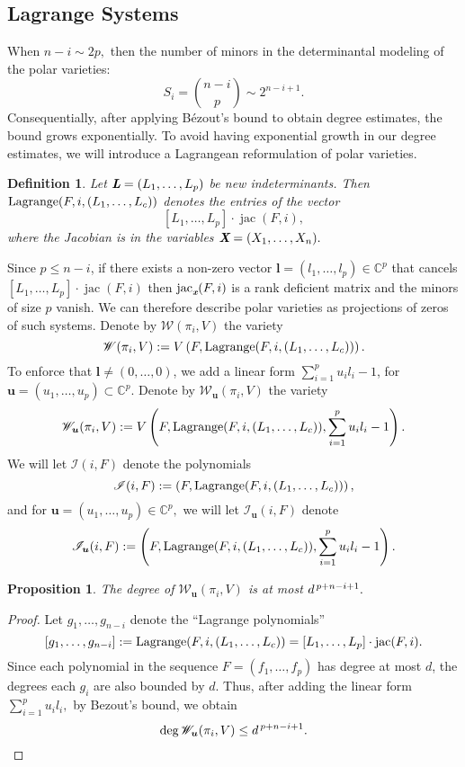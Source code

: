 \documentclass[a4paper]{article}
\def\sW{\mathscr{W}}
\def\sI{\mathscr{I}}
\def\Lb{\textit{\textbf{L}}}
\def\Xb{\textit{\textbf{X}}}
\def\ub{{\bm u}}
\def\lb{{\bm l}}
\def\xb{\textit{\textbf{x}}}
\DeclareMathOperator{\jac}{jac}
\DeclareMathOperator{\lag}{Lagrange}
\def\C{\mathbb{C}}
\def\ji{\jac_{\xb}(F,i)}
\def\lagF{{\bm\lag}(F,i,(L_1,\hdots,L_c))}
\def\Iil{\mathscr{I}_{\ub}(i,F)}
\def\Wil{\mathscr{W}_{\ub}(\pi_i,V)}
\def\udl{\sum_{i=1}^pu_il_i}
\newtheorem{prop}[theorem]{Proposition}
\newtheorem{definition}[theorem]{Definition}
\begin{document}
\subsection{Lagrange Systems} 
%
When $n-i \sim 2p,$ 
then the number of minors in the determinantal modeling of the polar varieties: \[S_i = \binom{n-i}{p}\sim 2^{n-i+1}.\] Consequentially, after applying B\'ezout’s bound to obtain degree estimates, the bound grows exponentially. To avoid having exponential growth in our degree estimates, we will introduce a Lagrangean reformulation of polar varieties. 

\begin{definition}
Let $\Lb = (L_1,\hdots,L_p)$ be new indeterminants. Then $\lagF$ denotes the entries of the vector
\[
[L_1,\hdots,L_p]\cdot \jac (F,i),
\] 
where the Jacobian is in the variables $\Xb=(X_1,\hdots,X_n).$
\end{definition}
Since $p \leq n-i$, if there exists a non-zero vector $\lb = (l_1,\hdots,l_p) \in \C^p$ that cancels $[L_1,\hdots,L_p]\cdot \jac (F,i)$ then $\ji$ is a rank deficient matrix and the minors of size $p$ vanish. We can therefore describe polar varieties as projections of zeros of such systems. Denote by $\sW(\pi_i,V)$ the variety
\[
\sW(\pi_i,V) := V\left(F, \lagF\right). 
\]
To enforce that $\lb \not = (0,\hdots,0)$, we add a linear form $\udl-1$, for $\ub = (u_1,\hdots,u_p) \subset \C^p.$ Denote by $\Wil$ the variety
\[
\Wil := V\left(F, \lagF,\udl-1\right).
\]
We will let $\sI(i,F)$
denote the polynomials 
\[
\sI(i,F) := \left(F, \lagF \right),
\]
and for $\ub = (u_1,\hdots,u_p) \in \C^p,$ we will let $\Iil$
denote 
\[
\Iil := \left(F, \lagF,\udl-1 \right).
\]
\begin{prop}
The degree of $\Wil$ is at most $d^{\hspace{.5mm}p+n-i+1}.$
\end{prop}
\begin{proof}
Let $g_1,\hdots,g_{n-i}$ denote the ``Lagrange polynomials''
\[
[g_1,\hdots,g_{n-i}] := \lagF = [L_1,\hdots,L_p]\cdot \jac (F,i).
\]
Since each polynomial in the sequence $F=(f_1,\hdots,f_p)$ has degree at most $d$, the degrees each $g_i$ are also bounded by $d.$  Thus, after adding the linear form $\udl,$ by Bezout's bound, we obtain
\[
\deg \Wil \leq d^{\hspace{.5mm}p+n-i+1}. 
\]
\end{proof}
%
%



\end{document}
